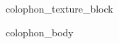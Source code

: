 \clearpage
{{colophon_texture_block}}
\thispagestyle{empty}
\begingroup
\small
\setlength{\parindent}{0pt}
\setlength{\parskip}{0.2\baselineskip}
\begin{flushleft}
{{colophon_body}}
\end{flushleft}
\endgroup

